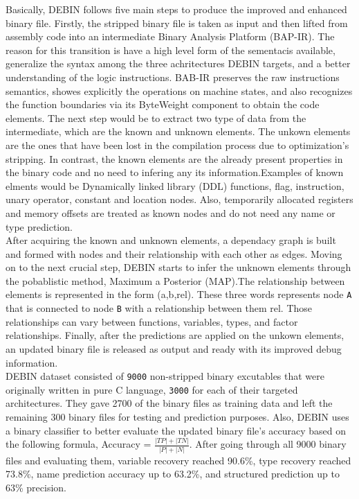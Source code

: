 \documentclass{article}
\begin{document}
\noindent Basically, DEBIN follows five main steps to produce the improved and enhanced binary file. Firstly, the stripped binary file is taken as input and then lifted from assembly code into an intermediate Binary Analysis Platform (BAP-IR). The reason for this transition is have a high level form of the sementacis available, generalize the 
syntax among the three achritectures DEBIN targets, and a better understanding of the logic instructions. BAB-IR preserves the raw instructions semantics, showes explicitly the operations on machine states, and also recognizes the function boundaries via its ByteWeight component to obtain the code elements. 
The next step would be to extract two type of data from the intermediate, which are the known and unknown elements. The unkown elements are the ones that have been lost in the compilation process due to optimization's stripping. In contrast, the known elements are the already present properties in the binary
code and no need to infering any its information.Examples of known elments would be Dynamically linked library (DDL) functions, flag, instruction, unary operator, constant and location nodes. Also, temporarily allocated registers and memory offsets are treated as known nodes and do not need any name or type prediction.\\ 

After acquiring the known and unknown elements, a dependacy graph is built and formed with nodes and their relationship with each other as edges.
Moving on to the next crucial step, DEBIN starts to infer the unknown elements through the pobablistic method, Maximum a Posterior (MAP).The relationship between elements is represented in the form (a,b,rel). These three words represents node \verb|A| that is connected to node \verb|B| with a relationship between them rel. Those relationships can vary between functions, variables, types, and factor relationships. 
Finally, after the predictions are applied on the unkown elements, an updated binary file is released as output and ready with its improved debug information.\\

\noindent DEBIN dataset consisted of \verb|9000| non-stripped binary excutables that were originally written in pure C language, \verb|3000| for each of their targeted architectures. They gave 2700 of the binary files as training data and left the remaining 300 binary files for testing and prediction purposes.
Also, DEBIN uses a binary classifier to better evaluate the updated binary file's accuracy based on the following formula, Accuracy = ${\frac{|TP|+|TN|}{|P|+|N|}}$. After going through all 9000 binary files and evaluating them, variable recovery reached 90.6\%, type recovery reached 73.8\%, name prediction accuracy up to 63.2\%, and structured prediction up to 63\% precision.\\
\end{document}
